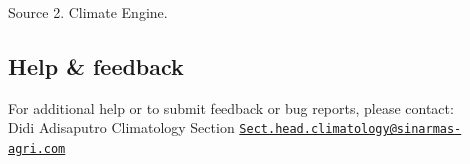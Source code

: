 \documentclass[
]{article}
\begin{document}
Source 2. Climate Engine.

\hypertarget{help-feedback}{%
\subsection{Help \& feedback}\label{help-feedback}}

For additional help or to submit feedback or bug reports, please
contact:\\
Didi Adisaputro Climatology Section
\href{mailto:Sect.head.climatology@sinarmas-agri.com}{\nolinkurl{Sect.head.climatology@sinarmas-agri.com}}
\end{document}
